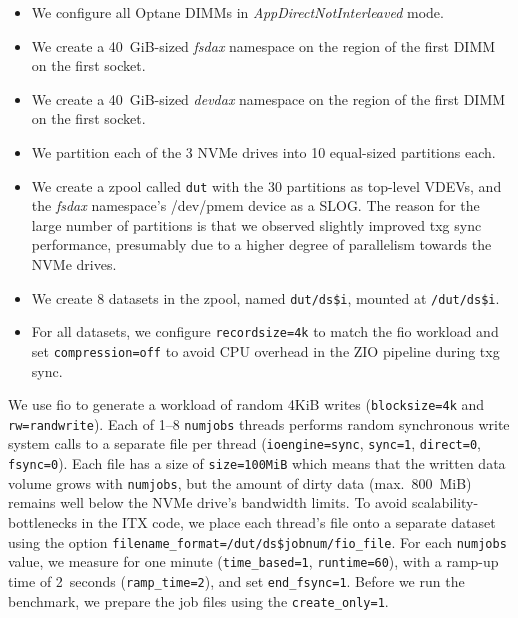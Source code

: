 \documentclass[12pt,a4paper,twoside]{book}
\begin{document}
{\begin{itemize}[noitemsep]
    \item We configure all Optane DIMMs in \textit{AppDirectNotInterleaved} mode.
    \item We create a 40~GiB-sized \textit{fsdax} namespace on the region of the first DIMM on the first socket.
    \item We create a 40~GiB-sized \textit{devdax} namespace on the region of the first DIMM on the first socket.
    \item We partition each of the 3 NVMe drives into 10 equal-sized partitions each.
    \item We create a zpool called \texttt{dut} with the 30 partitions as top-level VDEVs, and the \textit{fsdax} namespace's /dev/pmem device as a SLOG.
        The reason for the large number of partitions is that we observed slightly improved txg sync performance, presumably due to a higher degree of parallelism towards the NVMe drives.
    \item We create 8 datasets in the zpool, named \lstinline{dut/ds$i}, mounted at \lstinline{/dut/ds$i}.
    \item For all datasets, we configure \lstinline{recordsize=4k} to match the fio workload and set \lstinline{compression=off} to avoid CPU overhead in the ZIO pipeline during txg sync.
\end{itemize}

We use fio to generate a workload of random 4KiB writes (\lstinline{blocksize=4k} and \lstinline{rw=randwrite}).
Each of 1--8 \lstinline{numjobs} threads performs random synchronous write system calls to a separate file per thread (\lstinline{ioengine=sync}, \lstinline{sync=1}, \lstinline{direct=0}, \lstinline{fsync=0}).
Each file has a size of \lstinline{size=100MiB} which means that the written data volume grows with \lstinline{numjobs}, but the amount of dirty data (max.~800~MiB) remains well below the NVMe drive's bandwidth limits.
To avoid scalability-bottlenecks in the ITX code, we place each thread's file onto a separate dataset using the option \lstinline{filename_format=/dut/ds$jobnum/fio_file}.
For each \lstinline{numjobs} value, we measure for one minute (\lstinline{time_based=1}, \lstinline{runtime=60}), with a ramp-up time of 2~seconds (\lstinline{ramp_time=2}), and set \lstinline{end_fsync=1}.
Before we run the benchmark, we prepare the job files using the \lstinline{create_only=1}.

}
\end{document}
